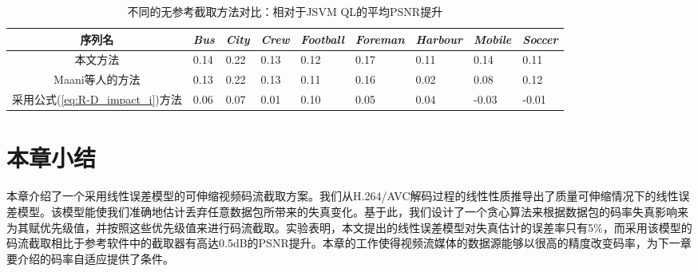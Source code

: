 \begin{table}[t]
	\centering
	\caption{不同的无参考截取方法对比：相对于JSVM QL的平均PSNR提升}
	\label{tab:methods-compare}
	\small
	\begin{minipage}{1.0\linewidth}
		\centering
		\begin{tabular}{c|*{3}{p{0.9cm}<{\centering}|}*{4}{p{1.1cm}<{\centering}|}p{0.9cm}<{\centering}}
			\hline \hline
			序列名 & {\em Bus} & {\em City} & {\em Crew} & {\em Football} & {\em Foreman} & {\em Harbour} & {\em Mobile} & {\em Soccer} \\ \hline
			本文方法  & 0.14 & 0.22 & 0.13 & 0.12 & 0.17 & 0.11 & 0.14 & 0.11 \\ \cline{1-9}
			Maani等人的方法\supercite{Maani2009} & 0.13 & 0.22 & 0.13 & 0.11 & 0.16 & 0.02 & 0.08 & 0.12 \\ \cline{1-9}
			采用公式(\ref{eq:R-D_impact_i})方法 & 0.06 & 0.07 & 0.01 & 0.10 & 0.05 & 0.04 & -0.03 & -0.01 \\ \hline
		\end{tabular}
	\end{minipage}
\end{table}

\section{本章小结}

本章介绍了一个采用线性误差模型的可伸缩视频码流截取方案。我们从H.264/AVC解码过程的线性性质推导出了质量可伸缩情况下的线性误差模型。该模型能使我们准确地估计丢弃任意数据包所带来的失真变化。基于此，我们设计了一个贪心算法来根据数据包的码率失真影响来为其赋优先级值，并按照这些优先级值来进行码流截取。实验表明，本文提出的线性误差模型对失真估计的误差率只有5\%，而采用该模型的码流截取相比于参考软件中的截取器有高达0.5dB的PSNR提升。本章的工作使得视频流媒体的数据源能够以很高的精度改变码率，为下一章要介绍的码率自适应提供了条件。